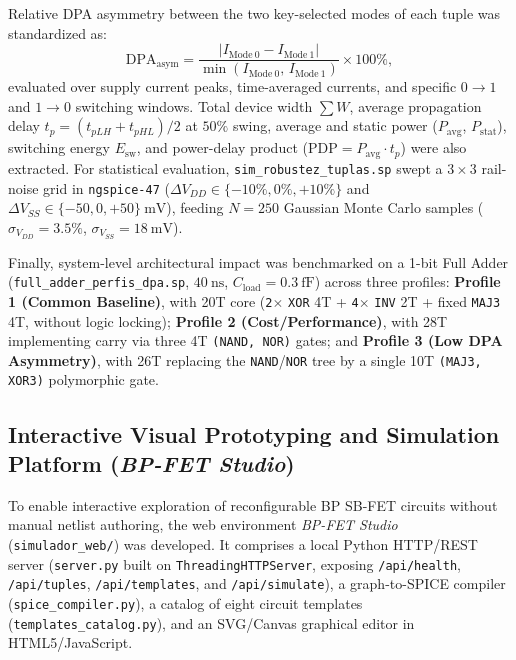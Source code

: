 Relative DPA asymmetry between the two key-selected modes of each tuple was standardized as:
\begin{equation}\label{eq:dpa_asym}
\mathrm{DPA}_{\mathrm{asym}} = \frac{|I_{\mathrm{Mode\ 0}} - I_{\mathrm{Mode\ 1}}|}{\min(I_{\mathrm{Mode\ 0}},\, I_{\mathrm{Mode\ 1}})} \times 100\%,
\end{equation}
evaluated over supply current peaks, time-averaged currents, and specific $0\to 1$ and $1\to 0$ switching windows. Total device width $\sum W$, average propagation delay $t_p = (t_{pLH} + t_{pHL})/2$ at $50\%$ swing, average and static power ($P_{\mathrm{avg}}$, $P_{\mathrm{stat}}$), switching energy $E_{\mathrm{sw}}$, and power-delay product ($\mathrm{PDP} = P_{\mathrm{avg}} \cdot t_p$) were also extracted. For statistical evaluation, \texttt{sim\_\allowbreak robustez\_\allowbreak tuplas.sp} swept a $3 \times 3$ rail-noise grid in \texttt{ngspice-47} ($\Delta V_{DD} \in \{-10\%, 0\%, +10\%\}$ and $\Delta V_{SS} \in \{-50, 0, +50\}\ \text{mV}$), feeding $N = 250$ Gaussian Monte Carlo samples ($\sigma_{V_{DD}} = 3.5\%$, $\sigma_{V_{SS}} = 18\ \text{mV}$).

Finally, system-level architectural impact was benchmarked on a 1-bit Full Adder (\texttt{full\_\allowbreak adder\_\allowbreak perfis\_\allowbreak dpa.sp}, $40\ \text{ns}$, $C_{\mathrm{load}} = 0.3\ \text{fF}$) across three profiles: \textbf{Profile 1 (Common Baseline)}, with 20T core (\texttt{2}$\times$ \texttt{XOR} 4T + \texttt{4}$\times$ \texttt{INV} 2T + fixed \texttt{MAJ3} 4T, without logic locking); \textbf{Profile 2 (Cost/Performance)}, with 28T implementing carry via three 4T \texttt{(NAND, NOR)} gates; and \textbf{Profile 3 (Low DPA Asymmetry)}, with 26T replacing the \texttt{NAND}/\texttt{NOR} tree by a single 10T \texttt{(MAJ3, XOR3)} polymorphic gate.

\subsection{Interactive Visual Prototyping and Simulation Platform (\textit{BP-FET Studio})}\label{sec:met_web}

To enable interactive exploration of reconfigurable BP SB-FET circuits without manual netlist authoring, the web environment \textit{BP-FET Studio} (\texttt{simulador\_web/}) was developed. It comprises a local Python HTTP/REST server (\texttt{server.py} built on \texttt{ThreadingHTTPServer}, exposing \texttt{/api/health}, \texttt{/api/tuples}, \texttt{/api/templates}, and \texttt{/api/simulate}), a graph-to-SPICE compiler (\texttt{spice\_compiler.py}), a catalog of eight circuit templates (\texttt{templates\_catalog.py}), and an SVG/Canvas graphical editor in HTML5/JavaScript.

